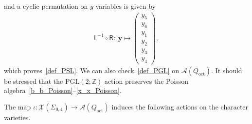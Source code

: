 \documentclass[10pt,a4paper]{amsart}
\numberwithin{equation}{section}
\begin{document}
 and a cyclic permutation on $y$-variables is given by
 \begin{gather*}
 \mathsf{L}^{-1} \circ \mathsf{R}\colon \
 \boldsymbol{y} \mapsto
 \left( \begin{matrix}
 y_5 \\ y_6 \\ y_1 \\ y_2 \\ y_3 \\ y_4
 \end{matrix} \right) ,
 \end{gather*}
 which proves~\eqref{def_PSL}. We can also check~\eqref{def_PGL} on $\mathcal{A}(Q_{\text{oct}})$. It should be stressed that the $\mathrm{PGL}(2;\mathbb{Z})$ action preserves the Poisson algebra~\eqref{b_b_Poisson}--\eqref{x_x_Poisson}.

The map $\iota\colon \mathcal{X}(\Sigma_{0,4}) \to\mathcal{A}(Q_{\text{oct}})$ induces the following actions on the character varieties.
\end{document}
